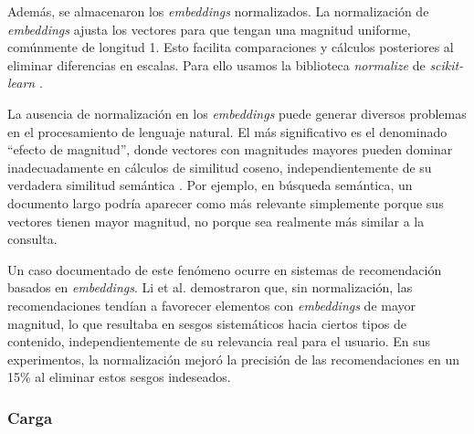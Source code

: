 \documentclass[11pt,a4paper,twoside,openany]{tesis}
\begin{document}
Además, se almacenaron los \emph{embeddings} normalizados. La normalización de \emph{embeddings} ajusta los vectores para que tengan una magnitud uniforme, comúnmente de longitud 1. Esto facilita comparaciones y cálculos posteriores al eliminar diferencias en escalas. Para ello usamos la biblioteca \emph{normalize} de \emph{scikit-learn} \cite{sklearn_normalize}.

La ausencia de normalización en los \emph{embeddings} puede generar diversos problemas en el procesamiento de lenguaje natural. El más significativo es el denominado ``efecto de magnitud'', donde vectores con magnitudes mayores pueden dominar inadecuadamente en cálculos de similitud coseno, independientemente de su verdadera similitud semántica \cite{mu2018all}. Por ejemplo, en búsqueda semántica, un documento largo podría aparecer como más relevante simplemente porque sus vectores tienen mayor magnitud, no porque sea realmente más similar a la consulta.

Un caso documentado de este fenómeno ocurre en sistemas de recomendación basados en \emph{embeddings}. Li et al. \cite{li2020improving} demostraron que, sin normalización, las recomendaciones tendían a favorecer elementos con \emph{embeddings} de mayor magnitud, lo que resultaba en sesgos sistemáticos hacia ciertos tipos de contenido, independientemente de su relevancia real para el usuario. En sus experimentos, la normalización mejoró la precisión de las recomendaciones en un 15\% al eliminar estos sesgos indeseados.

\subsubsection{Carga} \textbf{ }
\end{document}
